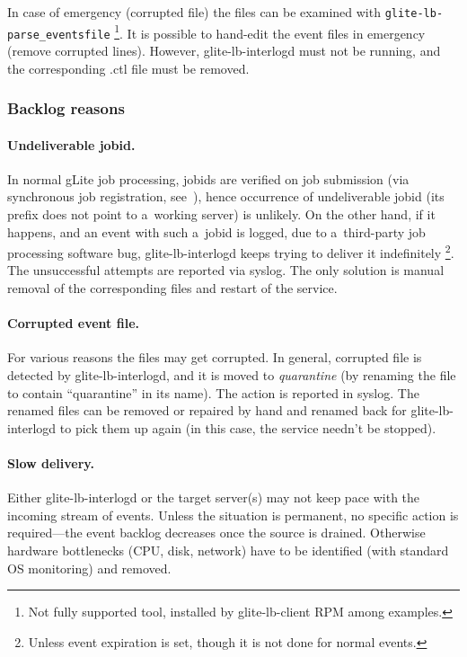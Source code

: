 \begin{sloppypar}
In case of emergency (\eg corrupted file) the files can be examined
with \verb'glite-lb-parse_eventsfile'%
\footnote{Not fully supported tool, installed by glite-lb-client RPM among examples.}.
It is possible to hand-edit the event files in emergency (remove corrupted lines).
However, glite-lb-interlogd must not be running, and the corresponding .ctl file
must be removed.
\end{sloppypar}

\subsubsection{Backlog reasons}

\paragraph{Undeliverable jobid.}
In normal gLite job processing, jobids are verified on job submission
(via synchronous job registration, see~\cite{lbug}), hence occurrence of
undeliverable jobid (\ie its prefix does not point to
a~working \LB server) is unlikely.
On the other hand, if it happens,
and an event with such a~jobid is logged,
\eg due to a~third-party job processing software bug,
glite-lb-interlogd keeps trying to deliver it indefinitely%
\footnote{Unless event expiration is set, though it is not done for normal events.}.
The unsuccessful attempts are reported via syslog.
The only solution is manual
removal of the corresponding files
and restart of the service.

\paragraph{Corrupted event file.} 
For various reasons the files may get corrupted.
In general, corrupted file is detected by glite-lb-interlogd, and it is moved
to \emph{quarantine} (by renaming the file to contain ``quarantine'' in its name).
The action is reported in syslog.
The renamed files can be removed or repaired by hand and renamed back
for glite-lb-interlogd to pick them up again
(in this case, the service needn't be stopped).

\paragraph{Slow delivery.}
Either glite-lb-interlogd or the target \LB server(s) may not keep pace 
with the incoming stream of events.
Unless the situation is permanent, no specific action is required---the 
event backlog decreases once the source is drained.
Otherwise hardware bottlenecks (CPU, disk, network) have to be identified
(with standard OS monitoring) and removed.

